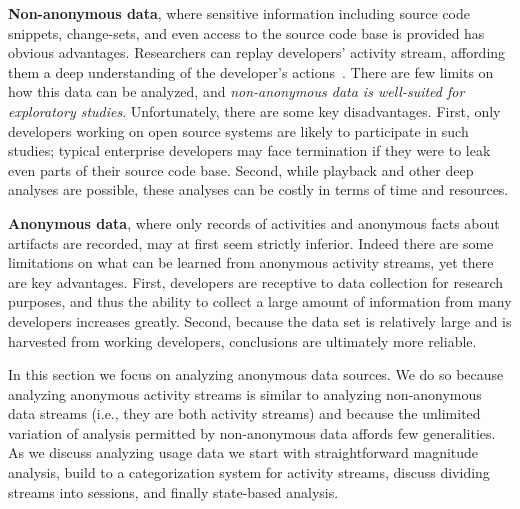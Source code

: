 \noindent
{\bf Non-anonymous data}, where sensitive information including source code snippets, change-sets, and even access to the source code base is provided has obvious advantages. Researchers can replay developers' activity stream, affording them a deep understanding of the developer's actions~\cite{UseDisuseMisuseRefactoringsExtendedVersion}. There are few limits on how this data can be analyzed, and {\em non-anonymous data is well-suited for exploratory studies}. Unfortunately, there are some key disadvantages. First, only developers working on open source systems are likely to participate in such studies; typical enterprise developers may face termination if they were to leak even parts of their source code base. Second, while playback and other deep analyses are possible, these analyses can be costly in terms of time and resources. 

\vspace{0.1in}

\noindent
{\bf Anonymous data}, where only records of activities and anonymous facts about artifacts are recorded, may at first seem strictly inferior. Indeed there are some limitations on what can be learned from anonymous activity streams, yet there are key advantages. First, developers are receptive to data collection for research purposes, and thus the ability to collect a large amount of information from many developers increases greatly. Second, because the data set is relatively large and is harvested from working developers, conclusions are ultimately more reliable. 

In this section we focus on analyzing anonymous data sources. We do so because analyzing anonymous activity streams is similar to analyzing non-anonymous data streams (i.e., they are both activity streams) and because the unlimited variation of analysis permitted by non-anonymous data affords few generalities. As we discuss analyzing usage data we start with straightforward magnitude analysis, build to a categorization system for activity streams, discuss dividing streams into sessions, and finally state-based analysis. 
